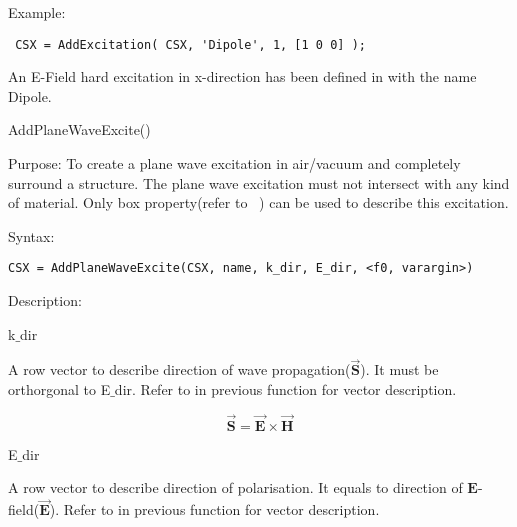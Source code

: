 \begin{FontDescr}{Example:}
\begin{lstlisting} 
 CSX = AddExcitation( CSX, 'Dipole', 1, [1 0 0] );
\end{lstlisting}
An E-Field hard excitation in x-direction has been defined in \hyperref[CSX]{} with the name Dipole. 
\end{FontDescr}


\begin{FontNameFunct}{AddPlaneWaveExcite()}
\end{FontNameFunct}

\begin{FontDescr}{Purpose:}
To create a plane wave excitation in air/vacuum and
completely surround a structure. The plane wave excitation must not intersect with any kind of material. Only box property(refer to ~) can be used to describe this excitation. 

\end{FontDescr}

\begin{FontDescr}{Syntax:}
\begin{lstlisting}
CSX = AddPlaneWaveExcite(CSX, name, k_dir, E_dir, <f0, varargin>)
\end{lstlisting}
\end{FontDescr}

\begin{FontDescr}{Description:}

\textcolor{varcol}{k$\_$dir}
\begin{myindentpar}%
A row vector to describe direction of wave propagation($\vec{\mathbf{S}}$).
It must be orthorgonal to E$\_$dir. Refer to \hyperref[excite_dir]{} in previous function for vector description.
\end{myindentpar}

\begin{equation}
\vec{\mathbf{S}}=\vec{\mathbf{E}}\times\vec{\mathbf{H}}
\end{equation}

\textcolor{varcol}{E$\_$dir} \label{Edir}
\begin{myindentpar}%
A row vector to describe direction of polarisation. It equals to direction of $\mathbf{E}$-field($\vec{\mathbf{E}}$). Refer to \hyperref[excite_dir]{} in previous function for vector description. 
\end{myindentpar}
\end{FontDescr}

